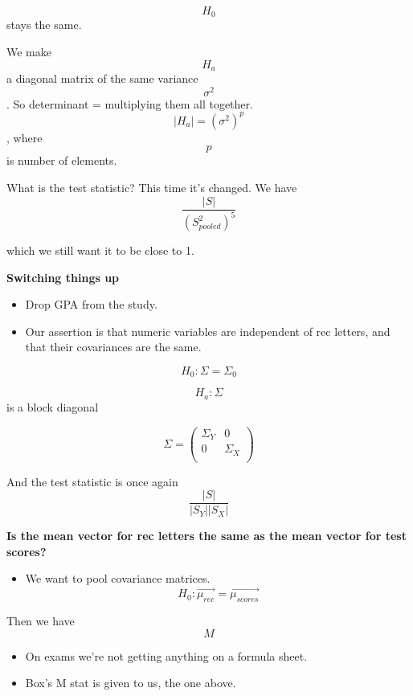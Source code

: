 \[H_0\] stays the same.

We make \[H_a\] a diagonal matrix of the same variance \[\sigma^2\]. So
determinant = multiplying them all together.
\[ | H_a | = (\sigma^2)^p \], where \[p\] is number of elements.

What is the test statistic? This time it's changed. We have
\[\frac{| S |}{(S_{pooled}^2)^5}\]

which we still want it to be close to 1.

\textbf{Switching things up}

\begin{itemize}
\tightlist
\item
  Drop GPA from the study.
\item
  Our assertion is that numeric variables are independent of rec
  letters, and that their covariances are the same.
\end{itemize}

\[H_0: \Sigma = \Sigma_0\]

\[H_a: \Sigma\] is a block diagonal

\[\Sigma = \left(\begin{array}{c} \Sigma_Y & 0 \\ 0 & \Sigma_X \\ \end{array} \right)\]

And the test statistic is once again \[\frac{| S |}{| S_Y | | S_X |}\]

\textbf{Is the mean vector for rec letters the same as the mean vector
for test scores?}

\begin{itemize}
\tightlist
\item
  We want to pool covariance matrices.
  \[H_0: \overrightarrow{\mu_{rec}} = \overrightarrow{\mu_{scores}}\]
\end{itemize}

Then we have \[M\]

\begin{itemize}
\tightlist
\item
  On exams we're not getting anything on a formula sheet.
\item
  Box's M stat is given to us, the one above.
\end{itemize}
